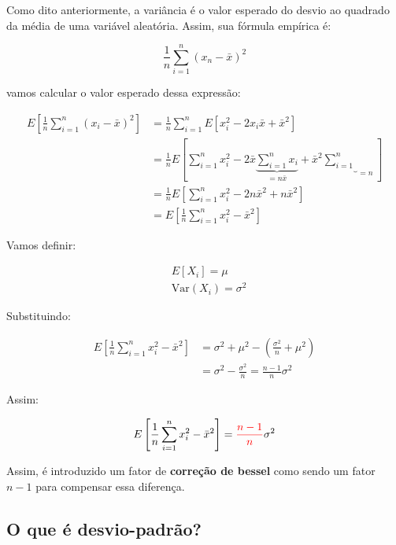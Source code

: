 \documentclass{article}
\begin{document}
Como dito anteriormente, a variância é o valor esperado do desvio ao quadrado da média de uma variável aleatória. Assim,  sua fórmula empírica é:

\begin{equation*}
    \frac{1}{n}\sum_{i = 1}^{n}(x_{n} - \bar{x})^{2}
\end{equation*}

vamos calcular o valor esperado dessa expressão:

\begin{align*}
    E\left[\frac{1}{n}\sum_{i = 1}^{n}(x_{i} - \bar{x})^{2}\right] &= \frac{1}{n}\sum_{i = 1}^{n}E\left[x_{i}^{2} - 2x_{i}\bar{x} + \bar{x}^{2}\right]  \\
    &= \frac{1}{n}E\left[\sum_{i = 1}^{n} x_{i}^{2} - 2\bar{x}\underbrace{\sum_{i = 1}^{n}x_{i}}_{= n \bar{x}} + \bar{x}^{2}\underbrace{\sum_{i = 1}^{n}}_{= n}\right] \\
    &= \frac{1}{n} E \left[\sum_{i = 1}^{n} x_{i}^{2}  -2n\bar{x}^{2} + n\bar{x}^{2}\right] \\
    &= E\left[\frac{1}{n}\sum_{i = 1}^{n} x_{i}^{2} - \bar{x}^{2}\right]
\end{align*}

Vamos definir:

\begin{align*}
    &E[X_i] = \mu \\
    &\text{Var}(X_i) = \sigma^{2}
\end{align*}

Substituindo:

\begin{align*}
    E\left[\frac{1}{n}\sum_{i = 1}^{n} x_{i}^{2} - \bar{x}^{2}\right] &= \sigma^{2} + \mu^{2} - \left(\frac{\sigma^{2}}{n} + \mu^{2}\right) \\
    &= \sigma^{2} - \frac{\sigma^{2}}{n} = \frac{n - 1}{n}\sigma^2
\end{align*}

Assim:

\begin{equation*}
    E\left[\frac{1}{n}\sum_{i = 1}^{n} x_{i}^{2} - \bar{x}^{2}\right] = \textcolor{red}{\frac{n - 1}{n}}\sigma^{2}
\end{equation*}

Assim, é introduzido um fator de \textbf{correção de bessel} como sendo um fator $n - 1$ para compensar essa diferença.

\subsection{O que é desvio-padrão?}
\end{document}
